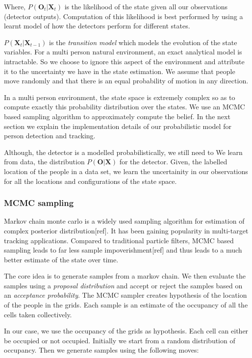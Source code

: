 Where, $P(\textbf{O}_{t} | \textbf{X}_{t})$ is the likelihood of the state given all our observations (detector outputs). Computation of this likelihood is best performed by using a learnt model of how the detectors perform for different states.

$P(\textbf{X}_{t}|\textbf{X}_{t-1})$ is the \textit{transition model} which models the evolution of the state variables. For a multi person natural environment, an exact analytical model is intractable. So we choose to ignore this aspect of the environment and attribute it to the uncertainty we have in the state estimation. We assume that people move randomly and that there is an equal probability of motion in any direction. 

In a multi person environment, the state space is extremely complex so as to compute exactly this probability 
distribution over the states. We use an MCMC based sampling algorithm to approximately compute the belief. In the next section we explain the implementation details of our probabilistic model for person detection and tracking.


Although, the detector is a modelled probabilistically, we still need to
We learn from data, the distribution $P(\textbf{O}|\textbf{X})$ for the detector. Given, the labelled location of the people in a data set, we learn the uncertainity in our observations for all the locations and configurations of the state space.
\subsubsection{MCMC sampling}
\label{MCMC}
Markov chain monte carlo is a widely used sampling algorithm for estimation of complex posterior distribution[ref]. It has been gaining popularity in multi-target tracking applications. Compared to traditional particle filters, MCMC based sampling leads to far less sample impoverishment[ref] and thus leads to a much better estimate of the state over time.

The core idea is to generate samples from a markov chain. We then evaluate the samples using a \textit{proposal distribution} and accept or reject the samples based on an \textit{acceptance probability}. The MCMC sampler creates hypothesis of the location of the people in the grids. Each sample is an estimate of the occupancy of all the cells taken collectively. 

In our case, we use the occupancy of the grids as hypothesis. Each cell can either be occupied or not occupied. Initially we start from a random distribution of occupancy. Then we generate samples using the following moves:

